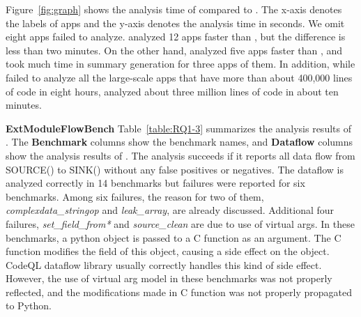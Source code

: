 Figure~\ref{fig:graph} shows the analysis time of \ours compared to \lees.
The x-axis denotes the labels of apps and the y-axis denotes the analysis
time in seconds. We omit eight apps \lees failed to analyze.
\lees analyzed 12 apps faster than \ours, but the difference is
less than two minutes. On the other hand,
\ours analyzed five apps faster than \lees, and \lees took much time
in summary generation for three apps of them. In 
addition, while \lees failed to analyze all the large-scale apps that have
more than about 400,000 lines of code in eight hours,
\ours analyzed about three million lines of
code in about ten minutes.




\textbf{ExtModuleFlowBench}
Table~\ref{table:RQ1-3} summarizes the analysis results of \ours.
The {\bf Benchmark} columns show the benchmark names,
and {\bf Dataflow} columns show the analysis results of \ours.
The analysis succeeds if it reports all data flow from SOURCE() to SINK() without any false positives or negatives.
The dataflow is analyzed correctly in 14
benchmarks but failures were reported for six benchmarks.
Among six failures, the reason for two of them,
{\it complexdata\_stringop} and {\it leak\_array}, are already discussed.
Additional four failures, {\it set\_field\_from*} and {\it source\_clean}
are due to use of virtual args. In these benchmarks, a python object is
passed to a C function as an argument. The C function modifies the field
of this object, causing a side effect on the object. CodeQL dataflow library
usually correctly handles this kind of side effect. However, the use of virtual arg model
in these benchmarks was not properly reflected, and the modifications made in C function
was not properly propagated to Python.

